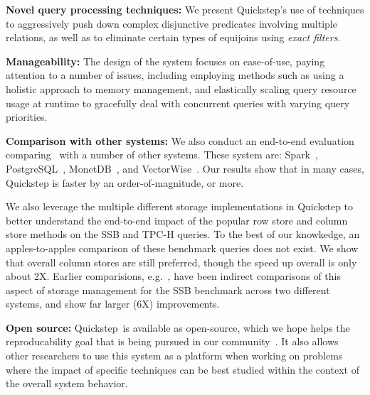 \textbf{Novel query processing techniques:} We present Quickstep's use of techniques to aggressively push down complex disjunctive predicates involving multiple relations, as well as to eliminate certain types of equijoins using \textit{exact filters}.

\textbf{Manageability:} The design of the system focuses on ease-of-use, paying attention to a number of issues, including employing methods such as using a holistic approach to memory management, and elastically scaling query resource usage at runtime to gracefully deal with concurrent queries with varying query priorities.

\textbf{Comparison with other systems:} We also conduct an end-to-end evaluation comparing \Quickstep\ with a number of other systems. These system are: Spark~\cite{Spark, SparkSQL}, PostgreSQL~\cite{postgres}, MonetDB~\cite{monetdb}, and VectorWise~\cite{vectorwise}. Our results show that in many cases, Quickstep is faster by an order-of-magnitude, or more.


We also leverage the multiple different storage implementations in Quickstep to better understand the end-to-end impact of the popular row store and column store methods on the SSB and TPC-H queries. To the best of our knowkedge, an apples-to-apples comparison of these benchmark queries does not exist. We show that overall column stores are still preferred, though the speed up overall is only about 2X. Earlier comparisions, e.g.~\cite{AbadiMH08}, have been indirect comparisons of this aspect of storage management for the SSB benchmark across two different systems, and show far larger (6X) improvements. %

\textbf{Open source:} Quickstep\ is available as open-source, which we hope helps the reproducability goal that is being pursued in our community~\cite{BonnetMBCGGHIIJKKMOPRTYFS11, ManegoldMAFGHHKKLLORSSWS09, ManolescuAADMPSSZS08}. It also allows other researchers to use this system as a platform when working on  problems where the impact of specific techniques can be best studied within the context of the overall system behavior.

